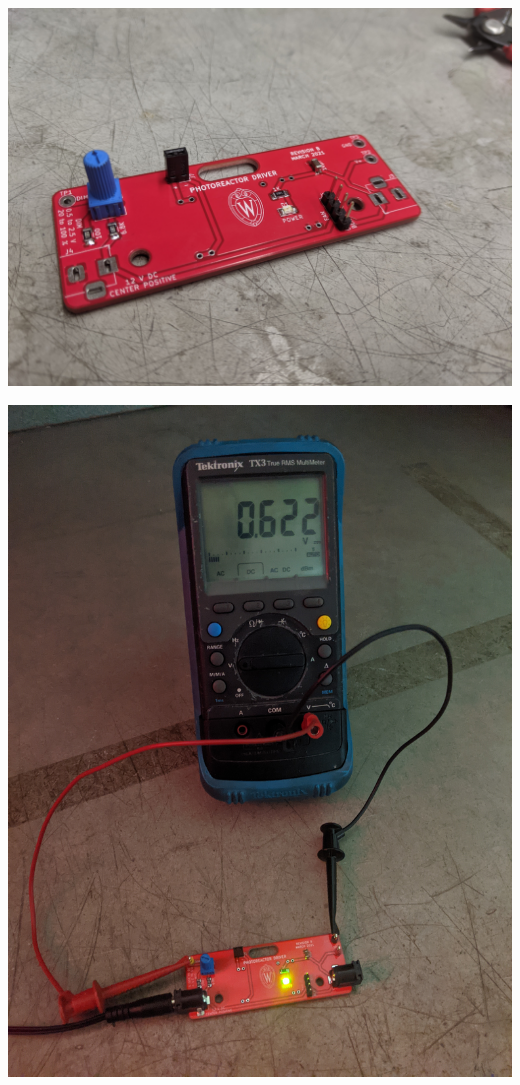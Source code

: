 \documentclass[11pt]{article}
\begin{document}
\begin{center}
  \includegraphics[width=\textwidth/2]{"./connectors.jpg"}
\end{center}

\begin{center}
  \includegraphics[width=\textwidth/2]{"./barrels-tested.jpg"}
\end{center}
\end{document}
